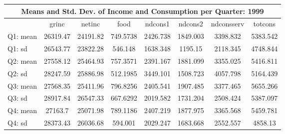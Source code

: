\begin{tabular}{l*{7}{c}}
\hline\hline
\multicolumn{8}{c}{Means and Std. Dev. of Income and Consumption per Quarter: 1999}  \\
\hline    
            &       grinc&      netinc&        food&     ndcons1&     ndcons2&  ndconsserv&     totcons\\
\hline
Q1: mean    &    26319.47&    24191.82&    749.5738&    2426.738&    1849.003&    3398.832&    5383.542\\
Q1: sd     &    26543.77&    23822.28&     546.148&    1638.348&     1195.15&    2118.345&    4748.844\\
Q2: mean     &    27558.12&    25464.93&    757.3571&    2391.167&    1881.099&    3355.025&    5416.811\\
Q2: sd    &    28247.59&    25886.98&    512.1985&    3449.101&    1508.723&    4057.798&    5164.439\\
Q3: mean     &    27568.35&    25411.96&    796.8256&    2405.541&    1907.485&    3377.465&    5655.266\\
Q3: sd  &    28917.84&    26547.33&    667.6292&    2019.582&    1731.204&    2508.424&    5387.097\\
Q4: mean     &     27163.7&    25071.98&    789.1186&    2407.219&    1877.975&    3365.568&    5459.781\\
Q4: sd     &    28373.43&    26036.68&     594.001&    2029.247&    1683.668&    2552.557&     4858.13\\
\hline\hline
\end{tabular}
